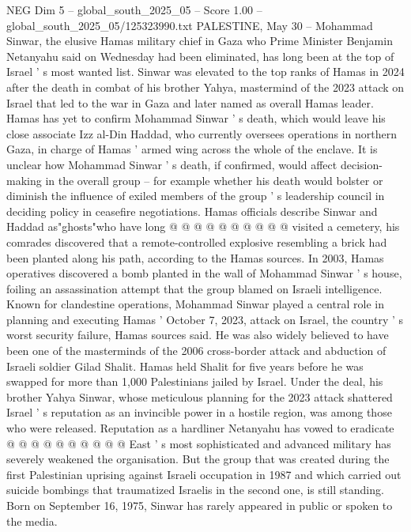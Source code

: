\begin{textsample}{NEG Dim 5 – global\_south\_2025\_05 – Score 1.00 – global\_south\_2025\_05/125323990.txt}  \label{ex:f5_neg_267}
PALESTINE, May 30 -- Mohammad Sinwar, the elusive Hamas military chief in Gaza who Prime Minister Benjamin Netanyahu said on Wednesday had been eliminated, has long been at the top of Israel ' s most wanted list.
Sinwar was elevated to the top ranks of Hamas in 2024 after the death in combat of his brother Yahya, mastermind of the 2023 attack on Israel that led to the war in Gaza and later named as overall Hamas leader.
Hamas has yet to confirm Mohammad Sinwar ' s death, which would leave his close associate Izz al-Din Haddad, who currently oversees operations in northern Gaza, in charge of Hamas ' armed wing across the whole of the enclave.
It is unclear how Mohammad Sinwar ' s death, if confirmed, would affect decision-making in the overall group -- for example whether his death would bolster or diminish the influence of exiled members of the group ' s leadership council in deciding policy in ceasefire negotiations.
Hamas officials describe Sinwar and Haddad as"ghosts"who have long @ @ @ @ @ @ @ @ @ @ visited a cemetery, his comrades discovered that a remote-controlled explosive resembling a brick had been planted along his path, according to the Hamas sources.
In 2003, Hamas operatives discovered a bomb planted in the wall of Mohammad Sinwar ' s house, foiling an assassination attempt that the group blamed on Israeli intelligence.
Known for clandestine operations, Mohammad Sinwar played a central role in planning and executing Hamas ' October 7, 2023, attack on Israel, the country ' s worst security failure, Hamas sources said.
He was also widely believed to have been one of the masterminds of the 2006 cross-border attack and abduction of Israeli soldier Gilad Shalit.
Hamas held Shalit for five years before he was swapped for more than 1,000 Palestinians jailed by Israel.
Under the deal, his brother Yahya Sinwar, whose meticulous planning for the 2023 attack shattered Israel ' s reputation as an invincible power in a hostile region, was among those who were released.
Reputation as a hardliner Netanyahu has vowed to eradicate @ @ @ @ @ @ @ @ @ @ East ' s most sophisticated and advanced military has severely weakened the organisation.
But the group that was created during the first Palestinian uprising against Israeli occupation in 1987 and which carried out suicide bombings that traumatized Israelis in the second one, is still standing.
Born on September 16, 1975, Sinwar has rarely appeared in public or spoken to the media.

\end{textsample}
